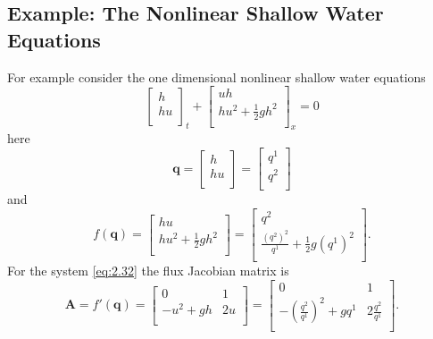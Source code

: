 \documentclass[twoside]{bsu-ms}
\begin{document}
\subsection{Example: The Nonlinear Shallow Water Equations }\label{subsec:2.3.1}
 For example consider the one dimensional 
 nonlinear shallow water equations 
\begin{equation}\label{eq:2.32}
    \begin{bmatrix}
    h\\
    hu\\
    \end{bmatrix}_{t}+\begin{bmatrix}
        uh\\
        hu^2+\frac{1}{2}gh^2\\
    \end{bmatrix}_{x}=0
\end{equation}
here 
\begin{equation}\label{eq:2.33}
    \mathbf{q}=\begin{bmatrix}
        h\\
        hu\\
    \end{bmatrix}
    =\begin{bmatrix}
        q^1\\
        q^2\\
    \end{bmatrix}
\end{equation}
and 
\begin{equation}\label{eq:2.34}
    f(\mathbf{q})=\begin{bmatrix}
        hu\\
        hu^2+\frac{1}{2}gh^2\\
    \end{bmatrix}
    =\begin{bmatrix}
        q^2\\
        \frac{(q^2)^2}{q^1}+\frac{1}{2}g(q^1)^2\\
    \end{bmatrix}.
\end{equation}
For the system \eqref{eq:2.32} the flux Jacobian matrix is
\begin{equation}\label{eq:2.35}
    \mathbf{A}=f'(\mathbf{q})=\begin{bmatrix}
        0&1\\
        -u^2+gh&2u\\
    \end{bmatrix}
    =\begin{bmatrix}
        0&1\\
        -\left(\frac{q^2}{q^1}\right)^2+gq^1&2\frac{q^2}{q^1}\\
    \end{bmatrix}.
\end{equation}
\end{document}

